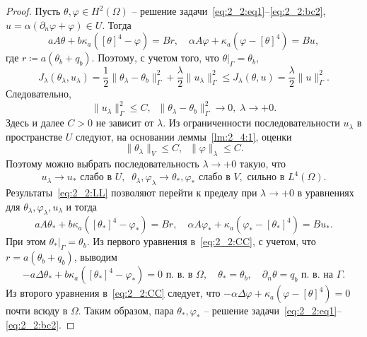 \begin{proof}
    Пусть $\theta,\varphi\in H^2(\Omega)$ -- решение
    задачи~\eqref{eq:2_2:eq1}--\eqref{eq:2_2:bc2},
    $u=\alpha(\partial_n\varphi + \varphi)\in U$.
    Тогда
    \[
        a A \theta + b \kappa_a ([\theta]^4 - \varphi ) = Br,\quad
        \alpha A \varphi + \kappa_a (\varphi - [\theta]^4) = Bu,
    \]
    где $r \coloneqq a(\theta_b+q_b)$.
    Поэтому, с учетом того, что $\theta|_\Gamma=\theta_b$,
    \[
        J_\lambda(\theta_\lambda, u_\lambda)
        = \frac{1}{2}\|\theta_\lambda -\theta_b\|^2_\Gamma
        + \frac{\lambda}{2}\|u_\lambda\|^2_\Gamma
        \leq J_\lambda(\theta, u) = \frac{\lambda}{2}\|u\|^2_\Gamma.
    \]
    Следовательно,
    \[
        \|u_\lambda\|^2_\Gamma\leq C,\;\; \|\theta_\lambda
        -\theta_b\|^2_\Gamma\to 0,\; \lambda\to + 0.
    \]
    Здесь и далее $C>0$ не зависит от $\lambda.$
    Из ограниченности последовательности $u_\lambda$ в пространстве $U$ следуют, на основании
    леммы~\ref{lm:2_4:1}, оценки
    \[
        \|\theta_\lambda\|_V \leq C,\;\;
        \|\varphi\|_\lambda \leq C.
    \]
    Поэтому можно выбрать последовательность $\lambda\to+0$ такую, что
    \begin{equation}
        \label{eq:2_2:LL}
        u_\lambda \rightarrow u_* \text{  слабо в } U, \;\;
        \theta_\lambda, \varphi_\lambda \rightarrow \theta_*,\varphi_*
        \text{ слабо в } V, \text{ сильно в } L^4(\Omega).
    \end{equation}
    Результаты~\eqref{eq:2_2:LL} позволяют перейти к пределу при $\lambda\to+0$
    в уравнениях для $\theta_\lambda,\varphi_\lambda,u_\lambda$ и тогда
    \begin{equation}
        \label{eq:2_2:CC}
        a A \theta_* + b \kappa_a ([\theta_*]^4 - \varphi_* ) = Br,\quad
        \alpha A \varphi_* + \kappa_a (\varphi_* - [\theta_*]^4)  = Bu_*.
    \end{equation}
    При этом $\theta_*|_\Gamma=\theta_b$.
    Из первого уравнения в~\eqref{eq:2_2:CC}, с учетом, что $r = a(\theta_b + q_b)$,
    выводим
    \[
        - a\Delta\theta_* + b\kappa_a([\theta_*]^4- \varphi_*) = 0 \text{ п.\ в. в }\Omega,
        \quad \theta_*=\theta_b,\quad \partial_n\theta = q_b \text{ п.\ в. на }\Gamma.
    \]
    Из второго уравнения в~\eqref{eq:2_2:CC} следует, что
    $-\alpha \Delta \varphi + \kappa_a(\varphi-[\theta]^4) = 0$ почти всюду в $\Omega$.
    Таким образом, пара $\theta_*,\varphi_*$
    -- решение задачи~\eqref{eq:2_2:eq1}--\eqref{eq:2_2:bc2}.
\end{proof}

